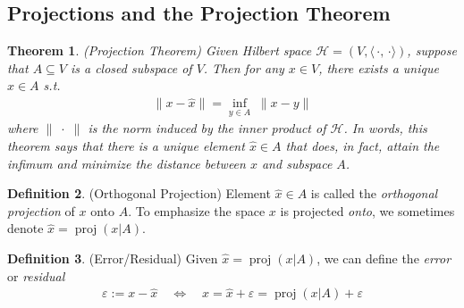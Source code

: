 \documentclass[12pt]{article}
\numberwithin{equation}{section} %
\theoremstyle{plain}
\newtheorem{thm}{Theorem}[section]
\newtheorem{cor}[thm]{Corollary}
\theoremstyle{definition}
\newtheorem{defn}[thm]{Definition}
\theoremstyle{remark}
\newtheorem*{rmk}{Remark}
\newcommand{\proj}{\operatorname{proj}}
\newcommand{\calH}{\mathcal{H}}
\begin{document}



\clearpage
\subsection{Projections and the Projection Theorem}

\begin{thm}\emph{(Projection Theorem)}
Given Hilbert space $\calH=(V,\langle\,\cdot,\,\cdot\rangle)$,
suppose that $A\subseteq V$ is a \emph{closed} subspace of $V$.
Then for any $x\in V$, there exists a \emph{unique}
$\hat{x}\in A$ s.t.
\begin{align}
  \lVert x-\hat{x} \rVert =
  \inf_{y\in A} \; \lVert x-y\rVert
  \label{projthm}
\end{align}
where $\lVert\;\cdot\;\rVert$ is the norm induced by the inner product
of $\calH$. In words, this theorem says that there is a unique element
$\hat{x}\in A$ that does, in fact, attain the infimum and minimize the
distance between $x$ and subspace $A$.
\end{thm}

\begin{defn}(Orthogonal Projection)
Element $\hat{x}\in A$ is called the \emph{orthogonal projection} of
$x$ onto $A$. To emphasize the space $x$ is projected \emph{onto}, we
sometimes denote $\hat{x}=\proj(x|A)$.
\end{defn}

\begin{defn}(Error/Residual)
Given $\hat{x}=\proj(x|A)$, we can define the \emph{error} or
\emph{residual}
\begin{align*}
  \varepsilon:=x-\hat{x}
  \quad\iff\quad
  x=\hat{x}+\varepsilon=\proj(x|A)+\varepsilon
\end{align*}
\end{defn}
\end{document}
